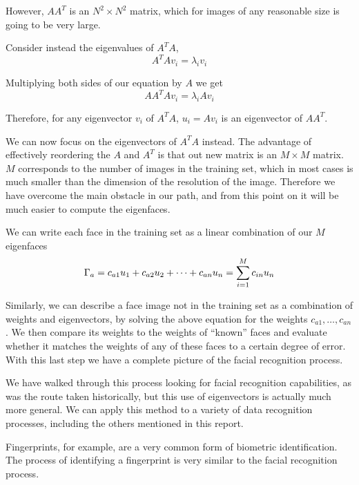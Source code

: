 \documentclass[12pt]{report}
\begin{document}
            However, $AA^T$ is an $N^2 \times N^2$ matrix, which for images of any reasonable size is going to be very large.

            Consider instead the eigenvalues of $A^T A$, 
                \[
                    A^TAv_{i} = \lambda_i v_i
                \]
            
            Multiplying both sides of our equation by $A$ we get
                \[
                    AA^TAv_{i} = \lambda_i Av_{i}
                \]

            Therefore, for any eigenvector $v_i$ of $A^TA$, $u_{i}=Av_{i}$ is an eigenvector of $AA^T$\cite{wiki:Eigenface}.
             
            We can now focus on the eigenvectors of $A^TA$ instead. The advantage of effectively reordering the $A$ and $A^T$ is that out new matrix is an $M \times M$ matrix. $M$ corresponds to the number of images in the training set, which in most cases is much smaller than the dimension of the resolution of the image. Therefore we have overcome the main obstacle in our path, and from this point on it will be much easier to compute the eigenfaces.
            
            We can write each face in the training set as a linear combination of our $M$ eigenfaces
                \[
                    \Gamma_a = c_{a1} u_1 + c_{a2} u_2 + \dots + c_{an} u_n \\
                     = \sum_{i=1}^M c_{in} u_n
                \] 

            Similarly, we can describe a face image not in the training set as a combination of weights and eigenvectors, by solving the above equation for the weights $c_{a1},\dots,c_{an}$. We then compare its weights to the weights of ``known'' faces and evaluate whether it matches the weights of any of these faces to a certain degree of error. With this last step we have a complete picture of the facial recognition process.

            We have walked through this process looking for facial recognition capabilities, as was the route taken historically, but this use of eigenvectors is actually much more general. We can apply this method to a variety of data recognition processes, including the others mentioned in this report.

            Fingerprints, for example, are a very common form of biometric identification. The process of identifying a fingerprint is very similar to the facial recognition process.
            
\end{document}
